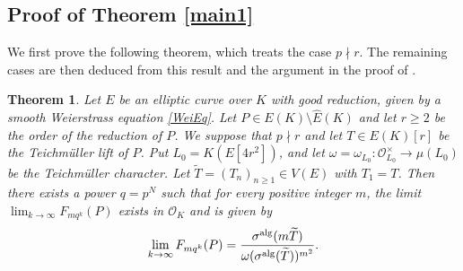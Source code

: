 \documentclass[11pt]{amsart}
\newtheorem{thm}{Theorem}[section]
\theoremstyle{definition}
\begin{document}
\subsection{Proof of Theorem \ref{main1}}

We first prove the following theorem, which treats the case $p \nmid r$. The remaining cases are then deduced from this result and the argument in the proof of \cite[Theorem 12]{Si05a}.

\begin{thm}\label{main1'}
Let $E$ be an elliptic curve over $K$ with good reduction, given by a smooth Weierstrass
equation \eqref{WeiEq}. Let $P \in E(K) \setminus \hat{E}(K)$ and let $r \geq 2$ be the order of the reduction of $P$. 
We suppose that $p \nmid r$ and let $T \in E(K)[r]$ be the Teichm\"{u}ller lift of $P$. 
Put $L_0=K(E[4r^2])$, and let
$\omega=\omega_{L_0}:\mathcal{O}_{L_0}^{\times}\to\mu(L_0)$
be the Teichm\"uller character.
Let $\widetilde{T}=(T_n)_{n \geq 1} \in V(E)$ with $T_1=T$.
Then there exists a power $q=p^N$ such that for every positive integer $m$, the limit
$\lim_{k\to \infty} F_{mq^k}(P)$ exists in $\mathcal{O}_K$ and is given by
%
\begin{align*}
\lim_{k\to \infty} F_{mq^k} (P)=\frac{\sigma^{\rm alg}(m\widetilde{T})}{\omega(\sigma^{\rm alg}(\widetilde{T}))^{m^2}}.
\end{align*}
%
\end{thm}
\end{document}
